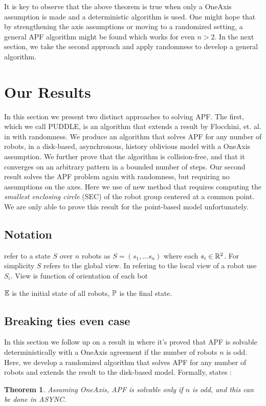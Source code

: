\documentclass[preprint,10pt]{elsarticle}
\newtheorem{theorem}{Theorem}
\begin{document}
	It is key to observe that the above theorem is true when only a OneAxis assumption is made and 
	a deterministic algorithm is used. One might hope that by strengthening the axis assumptions or
	moving to a randomized setting, a general APF algorithm might be found which works for even
	$n > 2$. In the next section, we take the second approach and apply randomness to develop
	a general algorithm.

\section{Our Results}
\label{ourRes}
	In this section we present two distinct approaches to solving APF. The first, which we call PUDDLE, is 
	an algorithm that extends a result by Flocchini, et. al. in \cite{flocchini08arbitrary} with randomness.
	We produce an algorithm that solves APF for any number of robots, in a disk-based, asynchronous, history
	oblivious model with a OneAxis assumption. We further prove that the algorithm is collision-free, and
	that it converges on an arbitrary pattern in a bounded number of steps. 
	Our second result solves the APF problem again with randomness, but requiring no assumptions on the axes.
	Here we use of new method that requires computing the \textit{smallest enclosing circle} (SEC) of
	the robot group centered at a common point. We are only able to prove this result for the point-based
	model unfortunately.

\subsection{Notation} 
	refer to a state $S$ over $n$ robots as $S = (s_1, \ldots s_n)$ where each $s_i \in \mathbb{R}^2$. For simplicity
	$S$ refers to the global view. In refering to the local view of a robot use $S_i$. View is function of orientation
	of each bot



	$\mathbb{E}$ is the initial state of all robots, $\mathbb{P}$ is the final state.

\subsection{Breaking ties even case } 
	In this section we follow up on a result in \cite{flocchini12distrib} where it's proved that
	APF is solvable deterministically with a OneAxis agreement if the number of robots $n$ is
	odd. Here, we develop a randomized algorithm that solves APF for any number of robots
	and extends the result to the disk-based model. Formally, \cite{flocchini12distrib} states :
	\begin{theorem} 
		Assuming OneAxis, APF is solvable only if $n$ is odd, and this can be done in ASYNC.
	\end{theorem} 
\end{document}
